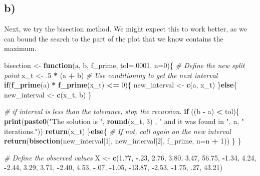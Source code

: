 \documentclass[]{article}
\newenvironment{Shaded}{\begin{snugshade}}{\end{snugshade}}
\newcommand{\KeywordTok}[1]{\textcolor[rgb]{0.13,0.29,0.53}{\textbf{#1}}}
\newcommand{\DataTypeTok}[1]{\textcolor[rgb]{0.13,0.29,0.53}{#1}}
\newcommand{\DecValTok}[1]{\textcolor[rgb]{0.00,0.00,0.81}{#1}}
\newcommand{\FloatTok}[1]{\textcolor[rgb]{0.00,0.00,0.81}{#1}}
\newcommand{\StringTok}[1]{\textcolor[rgb]{0.31,0.60,0.02}{#1}}
\newcommand{\CommentTok}[1]{\textcolor[rgb]{0.56,0.35,0.01}{\textit{#1}}}
\newcommand{\ControlFlowTok}[1]{\textcolor[rgb]{0.13,0.29,0.53}{\textbf{#1}}}
\newcommand{\OperatorTok}[1]{\textcolor[rgb]{0.81,0.36,0.00}{\textbf{#1}}}
\newcommand{\NormalTok}[1]{#1}
\begin{document}
\subsection{b)}\label{b-2}

Next, we try the bisection method. We might expect this to work better,
as we can bound the search to the part of the plot that we know contains
the maximum.

\begin{Shaded}
\begin{Highlighting}[]
\NormalTok{bisection <-}\StringTok{ }\ControlFlowTok{function}\NormalTok{(a, b, f_prime, }\DataTypeTok{tol=}\NormalTok{.}\DecValTok{0001}\NormalTok{, }\DataTypeTok{n=}\DecValTok{0}\NormalTok{)\{}
  \CommentTok{# Define the new split point}
\NormalTok{  x_t <-}\StringTok{ }\NormalTok{.}\DecValTok{5} \OperatorTok{*}\StringTok{ }\NormalTok{(a }\OperatorTok{+}\StringTok{ }\NormalTok{b)}
  \CommentTok{# Use conditioning to get the next interval}
  \ControlFlowTok{if}\NormalTok{(}\KeywordTok{f_prime}\NormalTok{(a) }\OperatorTok{*}\StringTok{ }\KeywordTok{f_prime}\NormalTok{(x_t) }\OperatorTok{<=}\StringTok{ }\DecValTok{0}\NormalTok{)\{}
\NormalTok{    new_interval <-}\StringTok{ }\KeywordTok{c}\NormalTok{(a, x_t)}
\NormalTok{  \}}\ControlFlowTok{else}\NormalTok{\{}
\NormalTok{    new_interval <-}\StringTok{ }\KeywordTok{c}\NormalTok{(x_t, b)}
\NormalTok{  \}}
  
  \CommentTok{# if interval is less than the tolerance, stop the recursion.}
  \ControlFlowTok{if}\NormalTok{ ((b }\OperatorTok{-}\StringTok{ }\NormalTok{a) }\OperatorTok{<}\StringTok{ }\NormalTok{tol)\{}
    \KeywordTok{print}\NormalTok{(}\KeywordTok{paste0}\NormalTok{(}\StringTok{"The solution is "}\NormalTok{, }\KeywordTok{round}\NormalTok{(x_t, }\DecValTok{3}\NormalTok{) , }\StringTok{" and it was found in "}\NormalTok{, n, }\StringTok{" iterations."}\NormalTok{))}
    \KeywordTok{return}\NormalTok{(x_t)}
\NormalTok{  \}}\ControlFlowTok{else}\NormalTok{\{}
    \CommentTok{# If not, call again on the new interval}
    \KeywordTok{return}\NormalTok{(}\KeywordTok{bisection}\NormalTok{(new_interval[}\DecValTok{1}\NormalTok{], new_interval[}\DecValTok{2}\NormalTok{], f_prime, }\DataTypeTok{n=}\NormalTok{n }\OperatorTok{+}\StringTok{ }\DecValTok{1}\NormalTok{))  }
\NormalTok{  \}}
\NormalTok{\}}

\CommentTok{# Define the observed values}
\NormalTok{X <-}\StringTok{ }\KeywordTok{c}\NormalTok{(}\FloatTok{1.77}\NormalTok{, }\OperatorTok{-}\NormalTok{.}\DecValTok{23}\NormalTok{, }\FloatTok{2.76}\NormalTok{, }\FloatTok{3.80}\NormalTok{, }\FloatTok{3.47}\NormalTok{, }\FloatTok{56.75}\NormalTok{, }\OperatorTok{-}\FloatTok{1.34}\NormalTok{, }\FloatTok{4.24}\NormalTok{, }
        \OperatorTok{-}\FloatTok{2.44}\NormalTok{, }\FloatTok{3.29}\NormalTok{, }\FloatTok{3.71}\NormalTok{, }\OperatorTok{-}\FloatTok{2.40}\NormalTok{, }\FloatTok{4.53}\NormalTok{, }\OperatorTok{-}\NormalTok{.}\DecValTok{07}\NormalTok{, }\OperatorTok{-}\FloatTok{1.05}\NormalTok{, }
        \OperatorTok{-}\FloatTok{13.87}\NormalTok{, }\OperatorTok{-}\FloatTok{2.53}\NormalTok{, }\OperatorTok{-}\FloatTok{1.75}\NormalTok{, .}\DecValTok{27}\NormalTok{, }\FloatTok{43.21}\NormalTok{)}


\end{Highlighting}
\end{Shaded}
\end{document}
